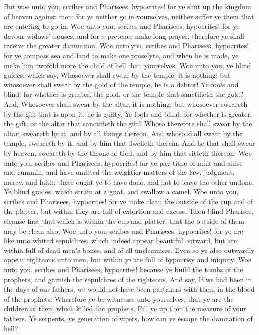  But woe unto you, scribes and Pharisees, hypocrites! for
ye shut up the kingdom of heaven against men: for ye neither go in
yourselves, neither suffer ye them that are entering to go in.
 Woe unto you, scribes and Pharisees, hypocrites! for ye
devour widows' houses, and for a pretence make long prayer: therefore ye
shall receive the greater damnation.  Woe unto you,
scribes and Pharisees, hypocrites! for ye compass sea and land to make
one proselyte, and when he is made, ye make him twofold more the child
of hell than yourselves.  Woe unto you, ye blind guides,
which say, Whosoever shall swear by the temple, it is nothing; but
whosoever shall swear by the gold of the temple, he is a debtor!
 Ye fools and blind: for whether is greater, the gold, or
the temple that sanctifieth the gold?  And, Whosoever
shall swear by the altar, it is nothing; but whosoever sweareth by the
gift that is upon it, he is guilty.  Ye fools and blind:
for whether is greater, the gift, or the altar that sanctifieth the
gift?  Whoso therefore shall swear by the altar, sweareth
by it, and by all things thereon.  And whoso shall swear
by the temple, sweareth by it, and by him that dwelleth therein.
 And he that shall swear by heaven, sweareth by the
throne of God, and by him that sitteth thereon.  Woe unto
you, scribes and Pharisees, hypocrites! for ye pay tithe of mint and
anise and cummin, and have omitted the weightier matters of the law,
judgment, mercy, and faith: these ought ye to have done, and not to
leave the other undone.  Ye blind guides, which strain at
a gnat, and swallow a camel.  Woe unto you, scribes and
Pharisees, hypocrites! for ye make clean the outside of the cup and of
the platter, but within they are full of extortion and excess.
 Thou blind Pharisee, cleanse first that which is within
the cup and platter, that the outside of them may be clean also.
 Woe unto you, scribes and Pharisees, hypocrites! for ye
are like unto whited sepulchres, which indeed appear beautiful outward,
but are within full of dead men's bones, and of all uncleanness.
 Even so ye also outwardly appear righteous unto men, but
within ye are full of hypocrisy and iniquity.  Woe unto
you, scribes and Pharisees, hypocrites! because ye build the tombs of
the prophets, and garnish the sepulchres of the righteous,
 And say, If we had been in the days of our fathers, we
would not have been partakers with them in the blood of the prophets.
 Wherefore ye be witnesses unto yourselves, that ye are
the children of them which killed the prophets.  Fill ye
up then the measure of your fathers.  Ye serpents, ye
generation of vipers, how can ye escape the damnation of hell?

